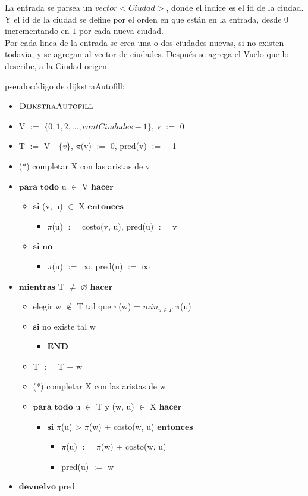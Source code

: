 \noindent
La entrada se parsea un $vector<Ciudad>$, donde el indice es el id de la ciudad. Y el id de la ciudad se define por el orden en que est\'an en la entrada, desde $0$ incrementando en $1$ por cada nueva ciudad.\\
Por cada linea de la entrada se crea una o dos ciudades nuevas, si no existen todavia, y se agregan al vector de ciudades. Despu\'es se agrega el Vuelo que lo describe, a la Ciudad origen.\\
\bigskip

\noindent
pseudoc\'odigo de dijkstraAutofill: \\


\begin{itemize}
\item $\textnormal{\scshape DijkstraAutofill}$
\item V $:=$ $\{0,1,2,...,cantCiudades-1\}$, v $:=$ $0$
\item T $:=$ V - $\{v\}$, $\pi$(v) $:=$ $0$, pred(v) $:=$ $-$1 
\item (*) completar X con las aristas de v
\item $\textbf{para todo}$ u $\in$ V $\textbf{hacer}$
\begin{itemize}
	\item $\textbf{si}$ (v, u) $\in$ X $\textbf{entonces}$
	\begin{itemize}
		\item $\pi$(u) $:=$ costo(v, u), pred(u) $:=$ v
	\end{itemize}
	\item $\textbf{si no}$
	\begin{itemize}
		\item $\pi$(u) $:=$ $\infty$, pred(u) $:=$ $\infty$
	\end{itemize}
\end{itemize}
\item $\textbf{mientras}$ T $\neq$ $\varnothing$ $\textbf{hacer}$
\begin{itemize}
	\item elegir w $\notin$ T tal que $\pi$(w) = $min_{u \in T}$ $\pi$(u)
	\item $\textbf{si}$ no existe tal w 
	\begin{itemize}
		\item $\textbf{END}$
	\end{itemize}
	\item T $:=$ T $-$ w 
	\item (*) completar X con las aristas de w
	\item $\textbf{para todo}$ u $\in$ T y (w, u) $\in$ X $\textbf{hacer}$
	\begin{itemize}
		\item $\textbf{si}$ $\pi$(u) > $\pi$(w) + costo(w, u) $\textbf{entonces}$
		\begin{itemize}
			\item $\pi$(u) $:=$ $\pi$(w) + costo(w, u)
			\item pred(u) $:=$ w
		\end{itemize}
	\end{itemize}
\end{itemize}
\item $\textbf{devuelvo}$ pred
\end{itemize}
\bigskip

